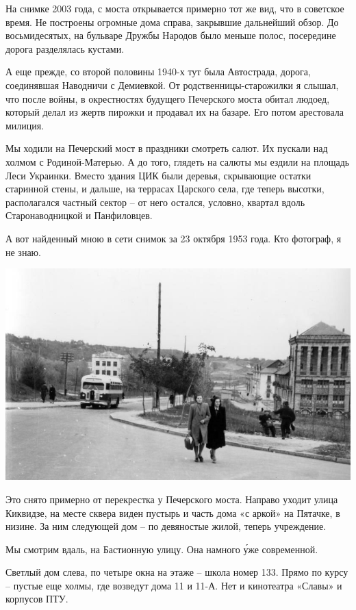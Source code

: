 На снимке 2003 года, с моста открывается примерно тот же вид, что в советское время. Не построены огромные дома справа, закрывшие дальнейший обзор. До восьмидесятых, на бульваре Дружбы Народов было меньше полос, посередине дорога разделялась кустами.

А еще прежде, со второй половины 1940-х тут была Автострада, дорога, соединявшая Наводничи с Демиевкой. От родственницы-старожилки я слышал, что после войны, в окрестностях будущего Печерского моста обитал людоед, который делал из жертв пирожки и продавал их на базаре. Его потом арестовала милиция.

Мы ходили на Печерский мост в праздники смотреть салют. Их пускали над холмом с Родиной-Матерью. А до того, глядеть на салюты мы ездили на площадь Леси Украинки. Вместо здания ЦИК были деревья, скрывающие остатки старинной стены, и дальше, на террасах Царского села, где теперь высотки, располагался частный сектор – от него остался, условно, квартал вдоль Старонаводницкой и Панфиловцев.

А вот найденный мною в сети снимок за 23 октября 1953 года. Кто фотограф, я не знаю.

\begin{center}
\includegraphics[width=\linewidth]{chast-vosp/zver/1953-oct-23-2.jpg}
\end{center}

Это снято примерно от перекрестка у Печерского моста. Направо уходит улица Киквидзе, на месте сквера виден пустырь и часть дома «с аркой» на Пятачке, в низине. За ним следующей дом – по девяностые жилой, теперь учреждение. 

Мы смотрим вдаль, на Бастионную улицу. Она намного \'уже современной.

Светлый дом слева, по четыре окна на этаже – школа номер 133. Прямо по курсу – пустые еще холмы, где возведут дома 11 и 11-А. Нет и кинотеатра «Славы» и корпусов ПТУ.


